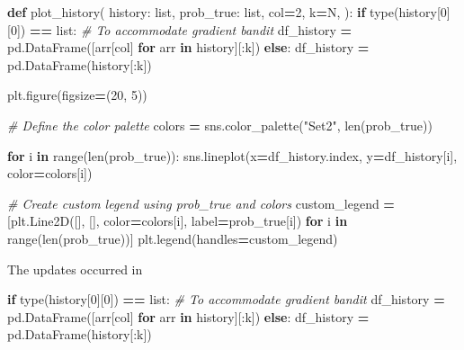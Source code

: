 \documentclass[
]{book}
\newenvironment{Shaded}{\begin{snugshade}}{\end{snugshade}}
\newcommand{\BuiltInTok}[1]{#1}
\newcommand{\CommentTok}[1]{\textcolor[rgb]{0.56,0.35,0.01}{\textit{#1}}}
\newcommand{\ControlFlowTok}[1]{\textcolor[rgb]{0.13,0.29,0.53}{\textbf{#1}}}
\newcommand{\DecValTok}[1]{\textcolor[rgb]{0.00,0.00,0.81}{#1}}
\newcommand{\KeywordTok}[1]{\textcolor[rgb]{0.13,0.29,0.53}{\textbf{#1}}}
\newcommand{\NormalTok}[1]{#1}
\newcommand{\OperatorTok}[1]{\textcolor[rgb]{0.81,0.36,0.00}{\textbf{#1}}}
\newcommand{\StringTok}[1]{\textcolor[rgb]{0.31,0.60,0.02}{#1}}
\theoremstyle{definition}
\theoremstyle{definition}
\theoremstyle{definition}
\theoremstyle{definition}
\theoremstyle{remark}
\begin{document}
\begin{Shaded}
\begin{Highlighting}[]
\KeywordTok{def}\NormalTok{ plot\_history(}
\NormalTok{        history: }\BuiltInTok{list}\NormalTok{,}
\NormalTok{        prob\_true: }\BuiltInTok{list}\NormalTok{,}
\NormalTok{        col}\OperatorTok{=}\DecValTok{2}\NormalTok{,}
\NormalTok{        k}\OperatorTok{=}\NormalTok{N,}
\NormalTok{):}
    \ControlFlowTok{if} \BuiltInTok{type}\NormalTok{(history[}\DecValTok{0}\NormalTok{][}\DecValTok{0}\NormalTok{]) }\OperatorTok{==} \BuiltInTok{list}\NormalTok{:  }\CommentTok{\# To accommodate gradient bandit}
\NormalTok{        df\_history }\OperatorTok{=}\NormalTok{ pd.DataFrame([arr[col] }\ControlFlowTok{for}\NormalTok{ arr }\KeywordTok{in}\NormalTok{ history][:k])}
    \ControlFlowTok{else}\NormalTok{:}
\NormalTok{        df\_history }\OperatorTok{=}\NormalTok{ pd.DataFrame(history[:k])}

\NormalTok{    plt.figure(figsize}\OperatorTok{=}\NormalTok{(}\DecValTok{20}\NormalTok{, }\DecValTok{5}\NormalTok{))}

    \CommentTok{\# Define the color palette}
\NormalTok{    colors }\OperatorTok{=}\NormalTok{ sns.color\_palette(}\StringTok{"Set2"}\NormalTok{, }\BuiltInTok{len}\NormalTok{(prob\_true))}

    \ControlFlowTok{for}\NormalTok{ i }\KeywordTok{in} \BuiltInTok{range}\NormalTok{(}\BuiltInTok{len}\NormalTok{(prob\_true)):}
\NormalTok{        sns.lineplot(x}\OperatorTok{=}\NormalTok{df\_history.index, y}\OperatorTok{=}\NormalTok{df\_history[i], color}\OperatorTok{=}\NormalTok{colors[i])}

    \CommentTok{\# Create custom legend using prob\_true and colors}
\NormalTok{    custom\_legend }\OperatorTok{=}\NormalTok{ [plt.Line2D([], [], color}\OperatorTok{=}\NormalTok{colors[i], label}\OperatorTok{=}\NormalTok{prob\_true[i]) }\ControlFlowTok{for}\NormalTok{ i }\KeywordTok{in} \BuiltInTok{range}\NormalTok{(}\BuiltInTok{len}\NormalTok{(prob\_true))]}
\NormalTok{    plt.legend(handles}\OperatorTok{=}\NormalTok{custom\_legend)}
\end{Highlighting}
\end{Shaded}

The updates occurred in

\begin{Shaded}
\begin{Highlighting}[]
    \ControlFlowTok{if} \BuiltInTok{type}\NormalTok{(history[}\DecValTok{0}\NormalTok{][}\DecValTok{0}\NormalTok{]) }\OperatorTok{==} \BuiltInTok{list}\NormalTok{:  }\CommentTok{\# To accommodate gradient bandit}
\NormalTok{        df\_history }\OperatorTok{=}\NormalTok{ pd.DataFrame([arr[col] }\ControlFlowTok{for}\NormalTok{ arr }\KeywordTok{in}\NormalTok{ history][:k])}
    \ControlFlowTok{else}\NormalTok{:}
\NormalTok{        df\_history }\OperatorTok{=}\NormalTok{ pd.DataFrame(history[:k])}
\end{Highlighting}
\end{Shaded}
\end{document}
